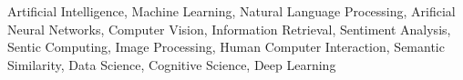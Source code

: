 {Artificial Intelligence, Machine Learning, Natural Language Processing, Arificial Neural Networks, Computer Vision,  Information Retrieval, Sentiment Analysis, Sentic Computing, Image Processing, Human Computer Interaction, Semantic Similarity, Data Science, Cognitive Science, Deep Learning}
